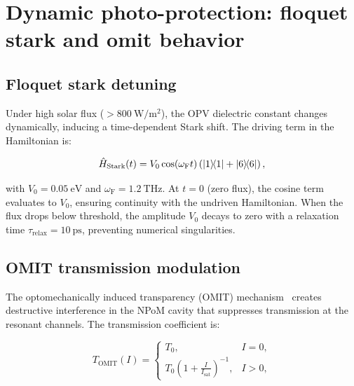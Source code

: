 \documentclass[11pt,a4paper]{article}
\begin{document}

\section{Dynamic photo-protection: floquet stark and omit behavior}
\label{SI-sec:npq}

\subsection{Floquet stark detuning}

Under high solar flux ($> \qty{800}{\W\per\m\squared}$), the OPV dielectric constant changes dynamically, inducing a time-dependent Stark shift.
The driving term in the Hamiltonian is:

\begin{equation}
\hat{H}_{\mathrm{Stark}}(t) = V_0 \cos(\omega_{\mathrm{F}} t) \left( \dyad{1}{1} + \dyad{6}{6} \right),
\label{eq:SI_stark_detuning}
\end{equation}

with $V_0 = \qty{0.05}{\eV}$ and $\omega_{\mathrm{F}} = \qty{1.2}{\THz}$.
At $t = 0$ (zero flux), the cosine term evaluates to $V_0$, ensuring continuity with the undriven Hamiltonian.
When the flux drops below threshold, the amplitude $V_0$ decays to zero with a relaxation time $\tau_{\mathrm{relax}} = \qty{10}{\ps}$, preventing numerical singularities.

\subsection{OMIT transmission modulation}

The optomechanically induced transparency (OMIT) mechanism~\cite{Aspelmeyer2014} creates destructive interference in the NPoM cavity that suppresses transmission at the resonant channels.
The transmission coefficient is:

\begin{equation}
T_{\mathrm{OMIT}}(I) = 
\begin{cases}
T_0, & I = 0, \\
T_0 \left(1 + \frac{I}{I_{\mathrm{sat}}}\right)^{-1}, & I > 0,
\end{cases}
\label{eq:SI_omit}
\end{equation}
\end{document}
